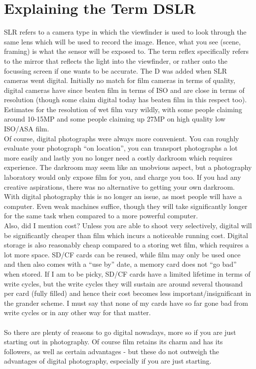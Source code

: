 \section{Explaining the Term DSLR}
\label{sec:Explaining-DSLR}

\Gls{SLR} refers to a camera type in which the viewfinder is used to look through the same lens which will be used to record the image. Hence, what you see (scene, framing) is what the \gls{sensor} will be exposed to. The term reflex specifically refers to the mirror that reflects the light into the \gls{viewfinder}, or rather onto the focussing screen if one wants to be accurate. The D was added when \gls{SLR} cameras went digital. Initially no match for film cameras in terms of quality, digital cameras have since beaten film in terms of \gls{ISO} and are close in terms of resolution (though some claim digital today has beaten film in this respect too).
\\
Estimates for the resolution of wet film vary wildly, with some people claiming around 10-15MP and some people claiming up 27MP on high quality low \gls{ISO}/ASA film.
\\
Of course, digital photographs were always more convenient. You can roughly evaluate your photograph ``on location'', you can transport photographs a lot more easily and lastly you no longer need a costly darkroom which requires experience. The darkroom may seem like an unobvious aspect, but a photography laboratory would only expose film for you, and charge you too. If you had any creative aspirations, there was no alternative to getting your own darkroom. With digital photography this is no longer an issue, as most people will have a computer. Even weak machines suffice, though they will take significantly longer for the same task when compared to a more powerful computer.
\\
Also, did I mention cost? Unless you are able to shoot very selectively, digital will be significantly cheaper than film which incurs a noticeable running cost. Digital storage is also reasonably cheap compared to a storing wet film, which requires a lot more space. \gls{SD}/\gls{CF} cards can be reused, while film may only be used once and then also comes with a ``use by'' date, a memory card does not ``go bad'' when stored. If I am to be picky, \gls{SD}/\gls{CF} cards have a limited lifetime in terms of write cycles, but the write cycles they will sustain are around several thousand per card (fully filled) and hence their cost becomes less important/insignificant in the grander scheme. I must say that none of my cards have so far gone bad from write cycles or in any other way for that matter.
\\
\\
So there are plenty of reasons to go digital nowadays, more so if you are just starting out in photography. Of course film retains its charm and has its followers, as well as certain advantages - but these do not outweigh the advantages of digital photography, especially if you are just starting.